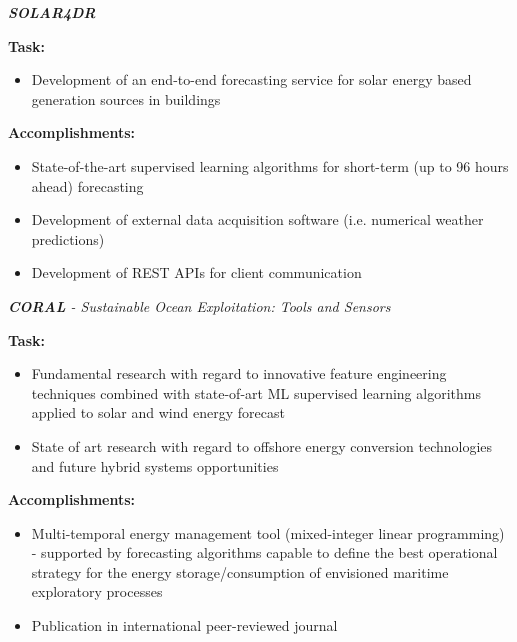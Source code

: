 \documentclass{mycv}
\begin{document}
\begin{myitemize}	
	\item \textit{\textbf{SOLAR4DR}}
	
		\vspace{0.15cm}
		\textbf{Task:}
		
		\begin{itemize}[itemsep=1px]
			\item Development of an end-to-end forecasting service for solar energy based generation sources in buildings
		\end{itemize}
	
		\vspace{0.15cm}
		\textbf{Accomplishments:}
		
		\begin{itemize}[itemsep=1px]
			\item State-of-the-art supervised learning algorithms for short-term (up to 96 hours ahead) forecasting
			\item Development of external data acquisition software (i.e. numerical weather predictions)
			\item Development of REST APIs for client communication
		\end{itemize}
	
	
	\vspace{0.3cm}	

	\item \textit{\textbf{CORAL} - Sustainable Ocean Exploitation: Tools and Sensors}

		\vspace{0.15cm}
		\textbf{Task:}

		\begin{itemize}[itemsep=1px]
			\item Fundamental research with regard to innovative feature engineering techniques combined with state-of-art ML supervised learning algorithms applied to solar and wind energy forecast
			\item State of art research with regard to offshore energy conversion technologies and future hybrid systems opportunities
		\end{itemize}
		
		\vspace{0.15cm}
		\textbf{Accomplishments:}
		
		\begin{itemize}[itemsep=1px]
			\item Multi-temporal energy management tool (mixed-integer linear programming) - supported by forecasting algorithms capable to define the best operational strategy for the energy storage/consumption of envisioned maritime exploratory processes
			\item Publication in international peer-reviewed journal
		\end{itemize}
		


		
\end{myitemize}
\pagebreak
\end{document}
